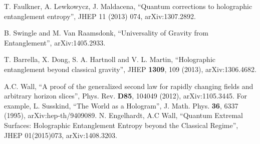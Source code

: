 \documentclass[12pt]{article}
\begin{document}
\begin{thebibliography}{99}
T. Faulkner, A. Lewkowycz, J. Maldacena, ``Quantum corrections to holographic entanglement entropy'', JHEP 11 (2013) 074, arXiv:1307.2892.

B. Swingle and M. Van Raamsdonk, ``Universality of Gravity from Entanglement'', arXiv:1405.2933.

T. Barrella, X. Dong, S. A. Hartnoll and V. L. Martin, ``Holographic entanglement beyond classical gravity'', JHEP \textbf{1309}, 109 (2013), arXiv:1306.4682.

A.C. Wall, ``A proof of the generalized second law for rapidly changing fields and arbitrary horizon slices'', Phys. Rev. \textbf{D85}, 104049 (2012), arXiv:1105.3445.
For example, L. Susskind, ``The World as a Hologram'', J. Math. Phys. \textbf{36}, 6337 (1995), arXiv:hep-th/9409089.
N. Engelhardt, A.C Wall, ``Quantum Extremal Surfaces: Holographic Entanglement Entropy beyond the Classical Regime'', JHEP 01(2015)073, arXiv:1408.3203.

\end{thebibliography}
\end{document}
